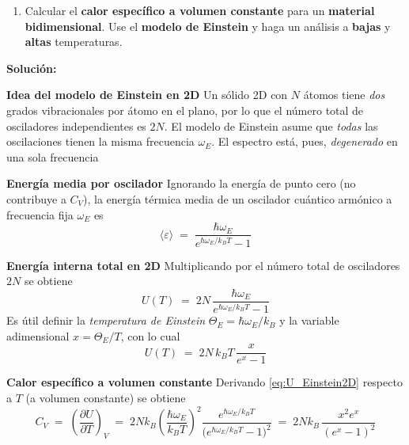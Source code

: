 \documentclass{article}
\newenvironment{AGbox}[1][7]%
{%
  \begin{tcolorbox}[
    enhanced, breakable,
    colframe=AppleGreen,
    colback=AppleGreen!#1,
    boxrule=1pt,
    borderline west={2mm}{-10mm}{AppleGreen},
    sharp corners=southwest,
    left=14pt,right=14pt,top=10pt,bottom=10pt,
     boxsep=6pt,
  ]%
}{%
  \end{tcolorbox}%
}
\begin{document}
\begin{AGbox}[8]
\begin{enumerate}[label={{\textcolor{trueblue}{\textbf{Pr.} \arabic*.4}}}, start=1]
  \item Calcular el \textbf{calor específico a volumen constante} para un \textbf{material bidimensional}. Use el \textbf{modelo de Einstein} y haga un análisis a \textbf{bajas} y \textbf{altas} temperaturas.
\end{enumerate}
\end{AGbox}

\textcolor{Cinnabar}{\textbf{Solución:}}

\noindent\textbf{Idea del modelo de Einstein en 2D}\;
Un sólido 2D con $N$ átomos tiene \textit{dos} grados vibracionales por átomo en el plano, por lo que el número total de osciladores independientes es $2N$. El modelo de Einstein asume que \emph{todas} las oscilaciones tienen la misma frecuencia $\omega_E$. El espectro está, pues, \textit{degenerado} en una sola frecuencia

\noindent\textbf{Energía media por oscilador}\;
Ignorando la energía de punto cero (no contribuye a $C_V$), la energía térmica media de un oscilador cuántico armónico a frecuencia fija $\omega_E$ es
\begin{equation}
  \langle \varepsilon \rangle \;=\; \frac{\hbar \omega_E}{e^{\hbar\omega_E/k_B T}-1}
  \label{eq:e_media_osc}
\end{equation}

\noindent\textbf{Energía interna total en 2D}\;
Multiplicando por el número total de osciladores $2N$ se obtiene
\begin{equation}
  U(T) \;=\; 2N \,\frac{\hbar \omega_E}{e^{\hbar\omega_E/k_B T}-1}
  \label{eq:U_Einstein2D}
\end{equation}
Es útil definir la \emph{temperatura de Einstein} $\Theta_E=\hbar\omega_E/k_B$ y la variable adimensional $x=\Theta_E/T$, con lo cual
\begin{equation}
  U(T) \;=\; 2N\,k_B T \,\frac{x}{e^{x}-1}
  \label{eq:U_Einstein2D_x}
\end{equation}

\noindent\textbf{Calor específico a volumen constante}\;
Derivando \eqref{eq:U_Einstein2D} respecto a $T$ (a volumen constante) se obtiene
\begin{equation}
  C_V \;=\; \left(\frac{\partial U}{\partial T}\right)_{V}
  \;=\;
  2N k_B \left(\frac{\hbar\omega_E}{k_B T}\right)^{\!2}
  \frac{e^{\hbar\omega_E/k_B T}}{\big(e^{\hbar\omega_E/k_B T}-1\big)^{\!2}}
  \;=\;
  2N k_B \,\frac{x^{2} e^{x}}{(e^{x}-1)^{2}}
  \label{eq:Cv_Einstein2D}
\end{equation}
\end{document}
